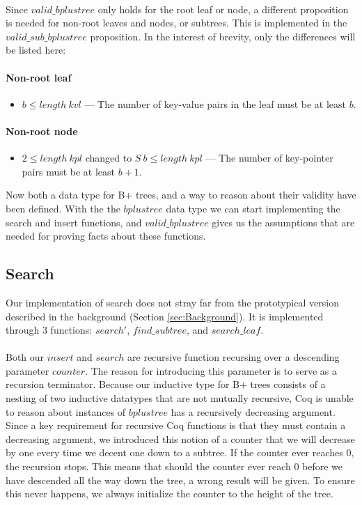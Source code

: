 \paragraph{}
Since $valid\_bplustree$ only holds for the root leaf or node, a different proposition is needed for non-root leaves and nodes, or subtrees. This is implemented in the $valid\_sub\_bplustree$ proposition. In the interest of brevity, only the differences will be listed here:

\paragraph{Non-root leaf}
\begin{itemize}
\item $b \leq length\ kvl$ --- The number of key-value pairs in the leaf must be at least $b$.
\end{itemize}

\paragraph{Non-root node}
\begin{itemize}
\item $2 \leq length\ kpl$ changed to $S\ b \leq length\ kpl$ --- The number of key-pointer pairs must be at least $b+1$.
\end{itemize}

Now both a data type for B+ trees, and a way to reason about their validity have been defined. With the the $bplustree$ data type we can start implementing the search and insert functions, and $valid\_bplustree$ gives us the assumptions that are needed for proving facts about these functions.

\subsection{Search}
\label{subsec:search}
Our implementation of search does not stray far from the prototypical version described in the background (Section \ref{sec:Background}). It is implemented through 3 functions: $search'$, $find\_subtree$, and $search\_leaf$. 

\paragraph{}
Both our $insert$ and $search$ are recursive function recursing over a descending parameter $counter$. The reason for introducing this parameter is to serve as a recursion terminator. Because our inductive type for B+ trees consists of a nesting of two inductive datatypes that are not mutually recursive, Coq is unable to reason about instances of $bplustree$ has a recursively decreasing argument. Since a key requirement for recursive Coq functions is that they must contain a decreasing argument, we introduced this notion of a counter that we will decrease by one every time we decent one down to a subtree. If the counter ever reaches $0$, the recursion stops. This means that should the counter ever reach $0$ before we have descended all the way down the tree, a wrong result will be given. To ensure this never happens, we always initialize the counter to the height of the tree.

